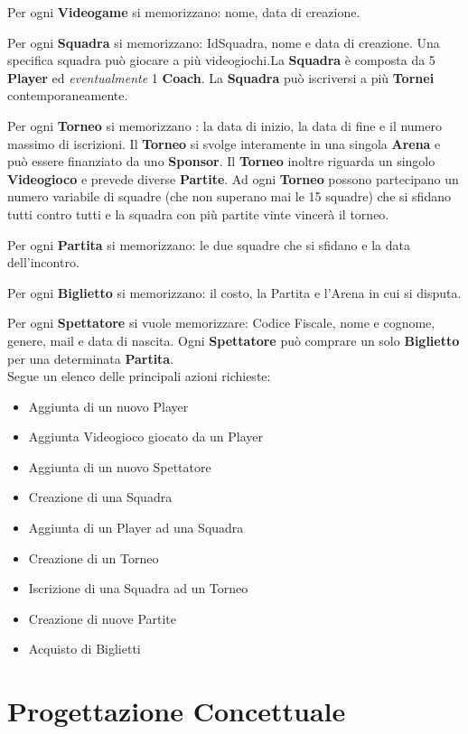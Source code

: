 \documentclass[a4paper,12pt]{report}
\begin{document}
Per ogni \textbf{Videogame} si memorizzano: nome, data di creazione.

Per ogni \textbf{Squadra} si memorizzano: IdSquadra, nome e data di creazione. Una specifica squadra può giocare a più videogiochi.La \textbf{Squadra} è composta da 5 \textbf{Player} ed \textit{eventualmente} 1 \textbf{Coach}. La \textbf{Squadra} può iscriversi a più \textbf{Tornei} contemporaneamente.

Per ogni \textbf{Torneo} si memorizzano : la data di inizio, la data di fine e il numero massimo di iscrizioni. Il \textbf{Torneo} si svolge interamente in una singola \textbf{Arena} e può essere finanziato da uno \textbf{Sponsor}. Il \textbf{Torneo} inoltre riguarda un singolo \textbf{Videogioco} e prevede diverse \textbf{Partite}. Ad ogni \textbf{Torneo} possono partecipano un numero variabile di squadre (che non superano mai le 15 squadre) che si sfidano tutti contro tutti e la squadra con più partite vinte vincerà il torneo.

Per ogni \textbf{Partita} si memorizzano: le due squadre che si sfidano e la data dell'incontro.

Per ogni \textbf{Biglietto} si memorizzano: il costo, la Partita e l'Arena in cui si disputa.

Per ogni \textbf{Spettatore} si vuole memorizzare: Codice Fiscale, nome e cognome, genere, mail e data di nascita. Ogni \textbf{Spettatore} può comprare un solo \textbf{Biglietto} per una determinata \textbf{Partita}.\\

Segue un elenco delle principali azioni richieste:
\begin{itemize}
	\setlength\itemsep{0.1em}
	\item Aggiunta di un nuovo Player
	\item Aggiunta Videogioco giocato da un Player
	\item Aggiunta di un nuovo Spettatore
	\item Creazione di una Squadra
	\item Aggiunta di un Player ad una Squadra
	\item Creazione di un Torneo
	\item Iscrizione di una Squadra ad un Torneo
	\item Creazione di nuove Partite
	\item Acquisto di Biglietti
\end{itemize}

\chapter{Progettazione Concettuale}
\end{document}
